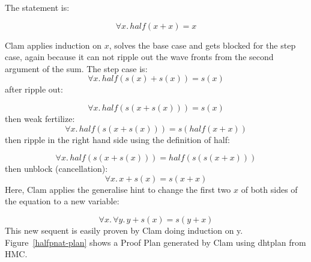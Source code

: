         The statement is:

\begin{equation}
\label{halfpnat}
\forall x.\, half( x +  x ) = x 
\end{equation}

        Clam applies induction on $x$, solves the base case and gets
blocked for the step case, again because it can not ripple out the wave
fronts from the second argument of the sum. The step case is:
\begin{equation}
\label{halfpnat-step}
\forall x.\, half( s(x) + s(x) ) = s(x)
\end{equation} after ripple out:

\begin{equation}
\label{halfpnat-rippleout}
\forall x.\, half( s( x + s(x) ) ) = s(x)
\end{equation} then weak fertilize:
\begin{equation}
\label{halfpnat-fert}
\forall x.\, half( s( x + s(x) ) ) = s( half( x +  x ) )
\end{equation} then ripple in the right hand side using the definition
of half:

\begin{equation}
\label{halfpnat-ripple}
\forall x.\, half( s( x + s(x) ) ) = half( s( s( x +  x ) ) )
\end{equation} then unblock (cancellation):
\begin{equation}
\label{halfpnat-unblock}
\forall x.\, x + s(x) = s( x +  x )
\end{equation} Here, Clam applies the generalise hint to change the
first two $x$ of both sides of the equation to a new variable:

\begin{equation}
\label{halfpnat-general}
\forall x.\, \forall y.\,y + s(x) = s( y + x )
\end{equation} This new sequent is easily proven by Clam doing
induction on y. Figure~\ref{halfpnat-plan} shows a Proof Plan generated
by Clam using dhtplan from HMC.

